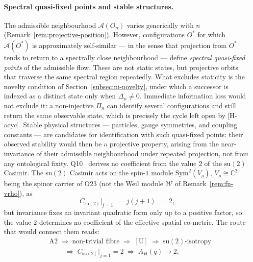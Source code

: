\documentclass[11pt,a4paper]{article}
\begin{document}
    \paragraph{Spectral quasi-fixed points and stable structures.}
      The admissible neighbourhood $\mathcal{A}(O_n)$ varies generically with $n$
      (Remark~\ref{rem:projective-position}).
      However, configurations $O^*$ for which $\mathcal{A}(O^*)$ is approximately
      self-similar --- in the sense that projection from $O^*$ tends to return to a
      spectrally close neighbourhood --- define \emph{spectral quasi-fixed points} of
      the admissible flow.
      These are not static states, but projective orbits that traverse the same spectral region
      repeatedly.
      What excludes staticity is the novelty condition of Section~\ref{subsec:ni-novelty}, under
      which a successor is indexed as a distinct state only when $\Delta_n \neq 0$.
      Immediate information loss would not exclude it: a non-injective $\Pi_n$ can identify
      several configurations and still return the same observable state, which is precisely the
      cycle left open by \textup{[H-acyc]}.
      Stable physical structures --- particles, gauge symmetries, and coupling constants ---
      are candidates for identification with such quasi-fixed points: their observed
      stability would then be a projective property, arising from the near-invariance of
      their admissible neighbourhood under repeated projection, not from any ontological
      fixity.
      Q10~\cite{Beau2026q10} derives no coefficient from the value $2$ of the $\mathrm{su}(2)$ Casimir.
      The $\mathrm{su}(2)$ Casimir acts on the spin-$1$ module $\mathrm{Sym}^2(V_\rho)$, $V_\rho \cong \mathbb{C}^2$
      being the spinor carrier of O23 (not the Weil module $\mathcal{W}$ of Remark~\ref{rem:fn-vrho}), as
      \begin{equation}
        \label{eq:casimir-2}
        C_{\mathrm{su}(2)}\big|_{j=1} \;=\; j(j+1) \;=\; 2,
      \end{equation}
      but invariance fixes an invariant quadratic form only up to a positive factor, so the
      value $2$ determines no coefficient of the effective spatial co-metric.
      The route that would connect them reads:
      \begin{equation}
        \label{eq:casimir-chain}
        \begin{aligned}
        &\mathrm{A2}
        \;\Rightarrow\; \text{non-trivial fibre}
        \;\Rightarrow\; [\mathrm{U}]
        \;\Rightarrow\; \mathrm{su}(2)\text{-isotropy}
        \\
        &\qquad\;\Rightarrow\; C_{\mathrm{su}(2)}|_{j=1} = 2
        \;\Rightarrow\; A_H(q) \to 2,
        \end{aligned}
      \end{equation}
\end{document}
